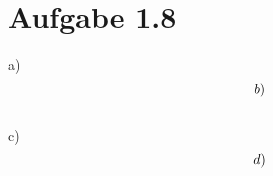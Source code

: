 \documentclass[a4paper, 10pt]{scrartcl}
\begin{document}
\section{Aufgabe 1.8}

a) $$\\
b) $$\\
c) $$\\
d) $$\\
\end{document}
